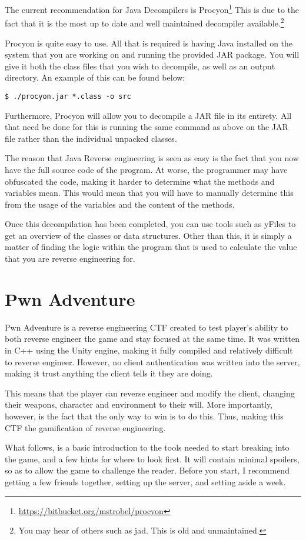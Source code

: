 		The current recommendation for Java Decompilers is Procyon\footnote{\url{https://bitbucket.org/mstrobel/procyon}}
		This is due to the fact that it is the most up to date and well maintained decompiler available.\footnote{You may hear of others such as jad. This is old and unmaintained.}

		Procyon is quite easy to use.
		All that is required is having Java installed on the system that you are working on and running the provided JAR package.
		You will give it both the class files that you wish to decompile, as well as an output directory.
		An example of this can be found below:
		\begin{lstlisting}[style=CLI]
			$ ./procyon.jar *.class -o src
		\end{lstlisting}

		Furthermore, Procyon will allow you to decompile a JAR file in its entirety.
		All that need be done for this is running the same command as above on the JAR file rather than the individual unpacked classes.

		The reason that Java Reverse engineering is seen as easy is the fact that you now have the full source code of the program.
		At worse, the programmer may have obfuscated the code, making it harder to determine what the methods and variables mean.
		This would mean that you will have to manually determine this from the usage of the variables and the content of the methods.

		Once this decompilation has been completed, you can use tools such as yFiles to get an overview of the classes or data structures.
		Other than this, it is simply a matter of finding the logic within the program that is used to calculate the value that you are reverse engineering for.

	\section{Pwn Adventure}
		Pwn Adventure is a reverse engineering CTF created to test player's ability to both reverse engineer the game and stay focused at the same time.
		It was written in C++ using the Unity engine, making it fully compiled and relatively difficult to reverse engineer.
		However, no client authentication was written into the server, making it trust anything the client tells it they are doing.

		This means that the player can reverse engineer and modify the client, changing their weapons, character and environment to their will.
		More importantly, however, is the fact that the only way to win is to do this.
		Thus, making this CTF the gamification of reverse engineering.

		What follows, is a basic introduction to the tools needed to start breaking into the game, and a few hints for where to look first.
		It will contain minimal spoilers, so as to allow the game to challenge the reader.
		Before you start, I recommend getting a few friends together, setting up the server, and setting aside a week.
